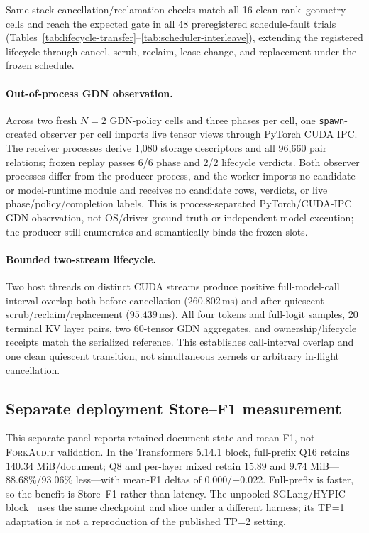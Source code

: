 \documentclass{article}
\newcommand{\method}{\textsc{ForkAudit}}
\begin{document}
Same-stack cancellation/reclamation checks match all 16 clean rank--geometry
cells and reach the expected gate in all 48 preregistered schedule-fault trials
(Tables~\ref{tab:lifecycle-transfer}--\ref{tab:scheduler-interleave}), extending
the registered lifecycle through cancel, scrub, reclaim, lease change, and
replacement under the frozen schedule.

\paragraph{Out-of-process GDN observation.}
Across two fresh $N=2$ GDN-policy cells and three phases per cell, one
\texttt{spawn}-created observer per cell imports live tensor views through
PyTorch CUDA IPC.  The receiver processes derive 1,080 storage descriptors and
all 96,660 pair relations; frozen replay passes 6/6 phase and 2/2 lifecycle
verdicts.  Both observer processes differ from the producer process, and the
worker imports no candidate or model-runtime module and receives no candidate
rows, verdicts, or live phase/policy/completion labels.  This is
process-separated PyTorch/CUDA-IPC GDN observation, not OS/driver ground truth
or independent model execution; the producer still enumerates and semantically
binds the frozen slots.

\paragraph{Bounded two-stream lifecycle.}
Two host threads on distinct CUDA streams produce positive full-model-call
interval overlap both before cancellation ($260.802\,\mathrm{ms}$) and after
quiescent scrub/reclaim/replacement ($95.439\,\mathrm{ms}$).  All four tokens
and full-logit samples, 20 terminal KV layer pairs, two 60-tensor GDN
aggregates, and ownership/lifecycle receipts match the serialized reference.
This establishes call-interval overlap and one clean quiescent transition, not
simultaneous kernels or arbitrary in-flight cancellation.

\FloatBarrier
\subsection{Separate deployment Store--F1 measurement}

This separate panel reports retained document state and mean F1, not
\method{} validation.  In the Transformers 5.14.1 block, full-prefix Q16
retains $140.34$ MiB/document; Q8 and per-layer mixed retain $15.89$ and $9.74$
MiB---$88.68\%$/$93.06\%$ less---with mean-F1 deltas of $0.000$/$-0.022$.
Full-prefix is faster, so the benefit is Store--F1 rather than latency.  The
unpooled SGLang/HYPIC block~\citep{liu2026hypic} uses the same checkpoint and
slice under a different harness; its TP=1 adaptation is not a reproduction of
the published TP=2 setting.
\end{document}
